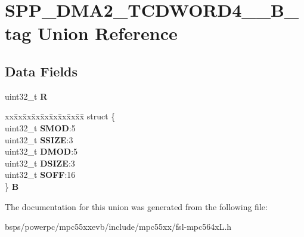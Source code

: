 \hypertarget{unionSPP__DMA2__TCDWORD4____32B__tag}{}\section{S\+P\+P\+\_\+\+D\+M\+A2\+\_\+\+T\+C\+D\+W\+O\+R\+D4\+\_\+\+\_\+B\+\_\+tag Union Reference}
\label{unionSPP__DMA2__TCDWORD4____32B__tag}
\subsection*{Data Fields}
\begin{DoxyCompactItemize}
\item 
\mbox{\label{unionSPP__DMA2__TCDWORD4____32B__tag_aab9d4bac3e8acc163a4ff829be61e260}} 
uint32\+\_\+t {\bfseries R}
\item 
\mbox{\label{unionSPP__DMA2__TCDWORD4____32B__tag_a8a5c89921ea21bd0a83d04a996e31881}} 
\begin{tabbing}
xx\=xx\=xx\=xx\=xx\=xx\=xx\=xx\=xx\=\kill
struct \{\\
\>uint32\_t {\bfseries SMOD}:5\\
\>uint32\_t {\bfseries SSIZE}:3\\
\>uint32\_t {\bfseries DMOD}:5\\
\>uint32\_t {\bfseries DSIZE}:3\\
\>uint32\_t {\bfseries SOFF}:16\\
\} {\bfseries B}\\

\end{tabbing}\end{DoxyCompactItemize}


The documentation for this union was generated from the following file\+:\begin{DoxyCompactItemize}
\item 
bsps/powerpc/mpc55xxevb/include/mpc55xx/fsl-\/mpc564x\+L.\+h\end{DoxyCompactItemize}

